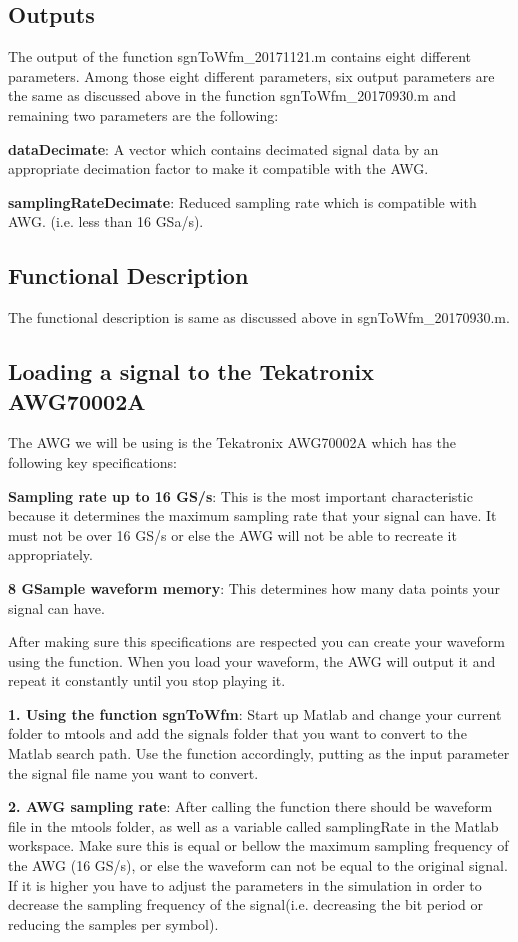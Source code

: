 \subsection*{Outputs}
The output of the function sgnToWfm\_20171121.m contains eight different parameters. Among those eight different parameters, six output parameters are the same as discussed above in the function sgnToWfm\_20170930.m and remaining two parameters are the following:
\bigskip

\textbf{dataDecimate}: A vector which contains decimated signal data by an appropriate decimation factor to make it compatible with the AWG.
\bigskip	

\textbf{samplingRateDecimate}: Reduced sampling rate which is compatible with AWG. (i.e. less than 16 GSa/s).

\subsection*{Functional Description}
The functional description is same as discussed above in sgnToWfm\_20170930.m.

\subsection{Loading a signal to the Tekatronix AWG70002A}

The AWG we will be using is the Tekatronix AWG70002A which has the following key specifications:
\bigskip

\textbf{Sampling rate up to 16 GS/s}: This is the most important characteristic  because it determines the maximum sampling rate that your signal can have. It must not be over 16 GS/s or else the AWG will not be able to recreate it appropriately.
\bigskip

\textbf{8 GSample waveform memory}: This determines how many data points your signal can have.
\bigskip

After making sure this specifications are respected you can create your waveform using the function. When you load your waveform, the AWG will output it and repeat it constantly until you stop playing it.
\bigskip

\textbf{1. Using the function sgnToWfm}:
Start up Matlab and change your current folder to mtools and add the signals folder that you want to convert to the Matlab search path. Use the function accordingly, putting as the input parameter the signal file name you want to convert.
\bigskip

\noindent
\textbf{2. AWG sampling rate}:
After calling the function there should be waveform file in the mtools folder, as well as a variable called samplingRate in the Matlab workspace. Make sure this is equal or bellow the maximum sampling frequency of the AWG (16 GS/s), or else the waveform can not be equal to the original signal. If it is higher you  have to adjust the parameters in the simulation in order to decrease the sampling frequency of the signal(i.e. decreasing the bit period or reducing the samples per symbol).
\bigskip

